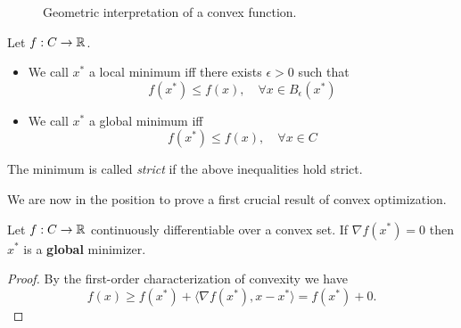 \begin{figure}
    \centering
        \caption{Geometric interpretation of a convex function.}
        \label{convexity:fig:gradients}
\end{figure}

\begin{defn}[Minimum]
    Let $f:C\rightarrow \mathbb{R}$. 
    \begin{itemize}
        \item We call $x^*$ a local minimum iff there exists $\epsilon>0$ such that 
        \[
            f(x^*)\leq f(x),\quad \forall x\in B_\epsilon(x^*)
        \]
        \item We call $x^*$ a global minimum iff
        \[
            f(x^*)\leq f(x),\quad \forall x\in C
        \]
    \end{itemize}
    The minimum is called \emph{strict} if the above inequalities hold strict.
\end{defn}

We are now in the position to prove a first crucial result of convex optimization.
\begin{prop}\label{convexity:prop:OC1}
    Let $f:C\rightarrow \mathbb{R}$ continuously differentiable over a convex set. If $\nabla f(x^*)=0$ then $x^*$ is a \textbf{global} minimizer.
\end{prop}
\begin{proof}
    By the first-order characterization of convexity we have
    \begin{equation}
        f(x)\geq f(x^*) + \langle \nabla f(x^*),x-x^*\rangle
        = f(x^*) + 0.
    \end{equation}
\end{proof}

